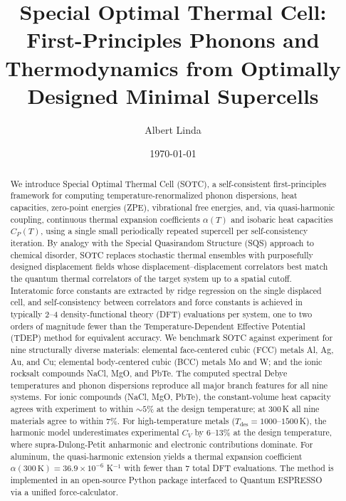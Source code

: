 \documentclass[aps,prb,reprint,amsmath,amssymb,floatfix]{revtex4-2}
\begin{document}
\title{Special Optimal Thermal Cell: First-Principles Phonons and Thermodynamics from Optimally Designed Minimal Supercells}

\author{Albert Linda}

\date{\today}

\begin{abstract}
We introduce Special Optimal Thermal Cell (SOTC), a self-consistent first-principles framework for computing temperature-renormalized phonon dispersions, heat capacities, zero-point energies (ZPE), vibrational free energies, and, via quasi-harmonic coupling, continuous thermal expansion coefficients $\alpha(T)$ and isobaric heat capacities $C_P(T)$, using a single small periodically repeated supercell per self-consistency iteration. By analogy with the Special Quasirandom Structure (SQS) approach to chemical disorder, SOTC replaces stochastic thermal ensembles with purposefully designed displacement fields whose displacement--displacement correlators best match the quantum thermal correlators of the target system up to a spatial cutoff. Interatomic force constants are extracted by ridge regression on the single displaced cell, and self-consistency between correlators and force constants is achieved in typically 2--4 density-functional theory (DFT) evaluations per system, one to two orders of magnitude fewer than the Temperature-Dependent Effective Potential (TDEP) method for equivalent accuracy. We benchmark SOTC against experiment for nine structurally diverse materials: elemental face-centered cubic (FCC) metals Al, Ag, Au, and Cu; elemental body-centered cubic (BCC) metals Mo and W; and the ionic rocksalt compounds NaCl, MgO, and PbTe. The computed spectral Debye temperatures and phonon dispersions reproduce all major branch features for all nine systems. For ionic compounds (NaCl, MgO, PbTe), the constant-volume heat capacity agrees with experiment to within $\sim5\%$ at the design temperature; at 300\,K all nine materials agree to within 7\%. For high-temperature metals ($T_\text{des} = 1000$--$1500$\,K), the harmonic model underestimates experimental $C_V$ by 6--13\% at the design temperature, where supra-Dulong-Petit anharmonic and electronic contributions dominate. For aluminum, the quasi-harmonic extension yields a thermal expansion coefficient $\alpha(300\,\text{K}) = 36.9\times10^{-6}$ K$^{-1}$ with fewer than 7 total DFT evaluations. The method is implemented in an open-source Python package interfaced to Quantum ESPRESSO via a unified force-calculator.
\end{abstract}
\end{document}
